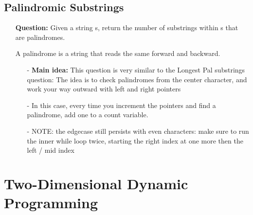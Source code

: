 \documentclass[12pt]{article}
\begin{document}
\subsection{Palindromic Substrings}
\begin{enumerate}
  \item[] \textbf{Question:} Given a string s, return the number of substrings within s that are palindromes.

A palindrome is a string that reads the same forward and backward.

    \begin{enumerate}
      \item[-] \textbf{Main idea:} This question is very similar to the Longest Pal substrings question: The idea is to check palindromes from the center character, and work your way outward with left and right pointers
      \item[-] In this case, every time you increment the pointers and find a palindrome, add one to a count variable. 
      \item[-] NOTE: the edgecase still persists with even characters: make sure to run the inner while loop twice, starting the right index at one more then the left / mid index
    \end{enumerate}
\end{enumerate}




\section{Two-Dimensional Dynamic Programming}
\end{document}
